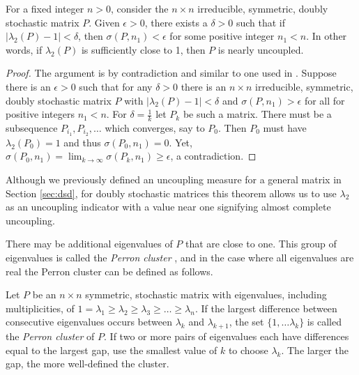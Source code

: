 \documentclass[final]{siamltex}
\begin{document}
\begin{theorem} \label{thm:hghard} 
For a fixed integer $n > 0$, consider the $n \times n$ irreducible, symmetric, doubly stochastic matrix $P$. Given $\epsilon > 0$, there exists a $\delta > 0$ such that if $|\lambda_{2}(P)-1| < \delta$, then $\sigma(P,n_{1}) < \epsilon$ for some positive integer $n_{1}<n$. In other words, if $\lambda_{2}(P)$ is sufficiently close to 1, then $P$ is nearly uncoupled.
\end{theorem}

\begin{proof}
The argument is by contradiction and similar to one used in \cite{hartfiel1998ssm}. Suppose there is an $\epsilon > 0$ such that for any $\delta > 0$ there is an $n \times n$ irreducible, symmetric, doubly stochastic matrix $P$ with $|\lambda_{2}(P)-1| < \delta$ and $\sigma(P,n_{1}) > \epsilon$ for all for positive integers $n_{1}<n$. For $\delta = \frac{1}{k}$ let $P_{k}$ be such a matrix. There must be a subsequence $P_{i_{1}}, P_{i_{2}}, \dots$ which converges, say to $P_{0}$. Then $P_{0}$ must have  $\lambda_{2}(P_{0}) = 1$ and thus $\sigma(P_{0},n_{1}) = 0$. Yet, $\sigma(P_{0},n_{1}) = \lim_{k \rightarrow \infty} \sigma(P_{k},n_{1}) \ge \epsilon$, a contradiction. 
\end{proof}

Although we previously defined an uncoupling measure for a general matrix in Section \ref{sec:dsd}, for doubly stochastic matrices this theorem allows us to use $\lambda_{2}$ as an uncoupling indicator with a value near one signifying almost complete uncoupling.

There may be additional eigenvalues of $P$ that are close to one. This group of eigenvalues is called the \emph{Perron cluster} \cite{deuflhard2000iai, deuflhard2005rbc}, and in the case where all eigenvalues are real the Perron cluster can be defined as follows.

\begin{definition}
Let $P$ be an $n \times n$ symmetric, stochastic matrix with eigenvalues, including multiplicities, of $1=\lambda_{1} \ge \lambda_{2} \ge \lambda_{3} \ge \dots \ge \lambda_{n}$. If the largest difference between consecutive eigenvalues occurs between $\lambda_{k}$ and $\lambda_{k+1}$, the set $\{1, \dots \lambda_{k}\}$ is called the \emph{Perron cluster} of $P$. If two or more pairs of eigenvalues each have differences equal to the largest gap, use the smallest value of $k$ to choose $\lambda_{k}$.  The larger the gap, the more well-defined the cluster.
\end{definition}
\end{document}
